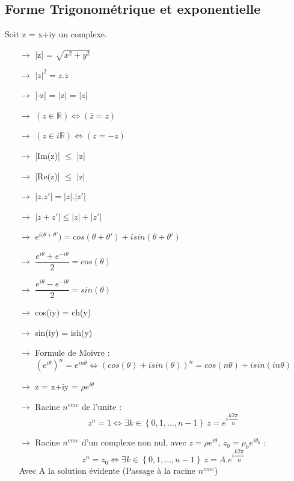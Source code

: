 \subsection{Forme Trigonométrique et exponentielle}
Soit z = x+iy un complexe.
\begin{itemize}
 \item[{$\rightarrow$}] |z| = $\sqrt{x^2+y^2}$\\
 \item[{$\rightarrow$}] $|z|^2 = z.\overline{z}$\\
 \item[{$\rightarrow$}] |-z| = |z| = $|\overline{z}|$\\
\item[{$\rightarrow$}] $(z \in \mathbb{R}) \Leftrightarrow (\overline{z} = z)$\\
\item[{$\rightarrow$}] $(z \in i\mathbb{R}) \Leftrightarrow (\overline{z} = -z)$\\
 \item[{$\rightarrow$}] |Im(z)| $\leq$ |z|\\
 \item[{$\rightarrow$}] |Re(z)| $\leq$ |z|\\
 \item[{$\rightarrow$}] $|z.z'| = |z|.|z'|$ \\
 \item[{$\rightarrow$}] $|z+z'| \leq |z|+|z'|$\\
\item[{$\rightarrow$}] $e^{i(\theta + \theta'}) = cos(\theta+\theta')+isin(\theta+\theta')$\\
\item[{$\rightarrow$}] $\dfrac{e^{i\theta}+e^{-i\theta}}{2} = cos(\theta)$\\
\item[{$\rightarrow$}] $\dfrac{e^{i\theta}-e^{-i\theta}}{2} = sin(\theta)$\\
\item[{$\rightarrow$}] cos(iy) = ch(y)\\
\item[{$\rightarrow$}] sin(iy) = ish(y)\\
\item[{$\rightarrow$}] Formule de Moivre : $$(e^{i\theta})^n =e^{in\theta} \Leftrightarrow (cos(\theta)+isin(\theta))^n = cos(n\theta)+isin(in\theta)$$
\item[{$\rightarrow$}] z = x+iy = $\rho e^{i\theta}$\\
\item[{$\rightarrow$}] Racine $n^{eme}$ de l'unite : $$z^n = 1 \Leftrightarrow \exists k \in \left\lbrace 0,1,...,n-1\right\rbrace~ z = e^{i\dfrac{k2\pi}{n}}$$
\item[{$\rightarrow$}] Racine $n^{eme}$ d'un complexe non nul, avec $z = \rho e^{i\theta}$, $z_0 = \rho_0 e^{i\theta_0}$ : $$z^n = z_0 \Leftrightarrow \exists k \in \left\lbrace 0,1,...,n-1\right\rbrace~ z =A.e^{i\dfrac{k2\pi}{n}}$$ Avec A la solution évidente (Passage à la racine $n^{eme}$)
\end{itemize}